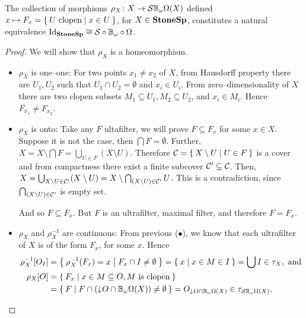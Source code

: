 \begin{proposition}
    The collection of morphisms $\rho_X\colon X \to \mathcal{S}\mathbb{B}_{\omega}\Omega(X)$ defined $x \mapsto F_x = \Set{U\text{ clopen} | x\in U }$, for $X \in \mathbf{StoneSp}$, constitutes a natural equivalence $\operatorname{Id}_{\mathbf{StoneSp}} \cong \mathcal{S}\circ\mathbb{B}_{\omega}\circ\Omega$.
\end{proposition}
\begin{proof}
    We will show that $\rho_X$ is a homeomorphism.
    \begin{itemize}
        \item $\rho_X$ is one--one: For two points $x_1 \neq x_2$ of $X$, from Hausdorff property there are $U_1, U_2$ such that $U_1\cap U_2 = \emptyset$ and $x_i\in U_i$. From zero--dimensionality of $X$ there are two clopen subsets $M_1 \subseteq U_1, M_2 \subseteq U_2$, and $x_i \in M_i$. Hence $F_{x_1} \neq F_{x_2}$.

        \item $\rho_X$ is onto: Take any $F$ ultafilter, we will prove $F \subseteq F_x$ for some $x\in X$. Suppose it is not the case, then $\bigcap F = \emptyset$. Further, $X = X \setminus \bigcap F = \bigcup_{U\in F} (X\setminus U)$. Therefore $\mathcal{ C } = \Set{X \setminus U | U\in F}$ is a cover and from compactness there exist a finite subcover $\mathcal{ C }'\subseteq \mathcal{ C }$. Then, $X = \bigcup_{X \setminus U\in \mathcal{ C }'} (X\setminus U) = X \setminus \bigcap_{(X \setminus U)\in \mathcal{ C }'} U$. This is a contradiction, since $\bigcap_{(X \setminus U)\in \mathcal{ C }'}$ is empty set.

        And so $F \subseteq F_x$. But $F$ is an ultrafilter, maximal filter, and therefore $F = F_x$.

        \item $\rho_X$ and $\rho_X^{-1}$ are continuous: From previous ($\bullet$), we know that each ultrafilter of $X$ is of the form $F_x$, for some $x$. Hence
        \begin{align*}
            \rho_X^{-1}[O_I] &= \Set{ \rho_X^{-1}(F_x) = x | F_x \cap I \neq \emptyset}
                = \Set{ x | x \in M \in I } = \bigcup I \in \tau_X, \text{ and}\\
            \rho_X[O] &= \Set{ F_x | x \in M \subseteq O, M \text{ is clopen}} \\
                      &= \Set{ F | F \cap (\mathord{\downarrow}\mkern1muO \cap \ensuremath{\mathbb{B}_{\omega}}\Omega(X)) \neq \emptyset} = O_{\mathord{\downarrow}\mkern1mu O \cap \mathbb{B}_{\omega}\Omega(X)} \in \tau_{\mathcal{S}\mathbb{B}_{\omega}\Omega(X)}.
        \end{align*}
    \end{itemize}


\end{proof}
